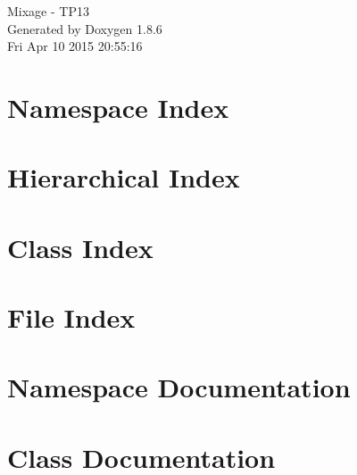 \documentclass[twoside]{book}
\newcommand{\clearemptydoublepage}{%
  \newpage{\pagestyle{empty}\cleardoublepage}%
}
\begin{document}
\hypersetup{pageanchor=false}
\begin{titlepage}
\vspace*{7cm}
\begin{center}%
{\Large Mixage -\/ T\-P13 }\\
\vspace*{1cm}
{\large Generated by Doxygen 1.8.6}\\
\vspace*{0.5cm}
{\small Fri Apr 10 2015 20:55:16}\\
\end{center}
\end{titlepage}
\clearemptydoublepage
\tableofcontents
\clearemptydoublepage
{}
\hypersetup{pageanchor=true}

\chapter{Namespace Index}

\chapter{Hierarchical Index}

\chapter{Class Index}

\chapter{File Index}

\chapter{Namespace Documentation}

\chapter{Class Documentation}























\end{document}
